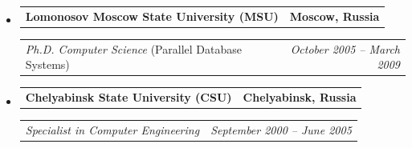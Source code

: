 \documentclass[11pt,letterpaper]{article}
\makeatletter
\newcommand{\headerrow}[2]
{\begin{tabular*}{\linewidth}{l@{\extracolsep{\fill}}r}
#1 &
#2 \\
\end{tabular*}}
\makeatother
\begin{document}
\begin{itemize}[leftmargin=1em]
	\parskip=0.1em
		
	\item
	      \headerrow
	      {\textbf{Lomonosov Moscow State University (MSU)}}
	      {\textbf{Moscow, Russia}}
	      \headerrow
	      {\emph{Ph.D. Computer Science} (Parallel Database Systems)}
	      {\emph{October 2005 -- March 2009}}
	\item
	      \headerrow
	      {\textbf{Chelyabinsk State University (CSU)}}
	      {\textbf{Chelyabinsk, Russia}}
	      \headerrow
	      {\emph{Specialist in Computer Engineering}}
	      {\emph{September 2000 -- June 2005}}
	      	      
\end{itemize}
\end{document}
